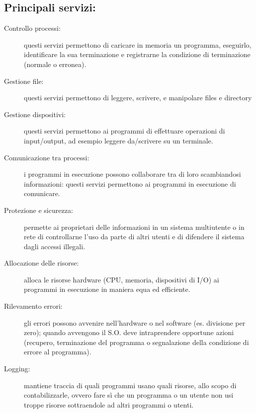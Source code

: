 \subsection{Principali servizi:}
\begin{description}
    \item[Controllo processi:] questi servizi permettono di caricare in memoria un programma, eseguirlo, identificare la sua terminazione e registrarne la condizione di terminazione (normale o erronea).
    \item[Gestione file:] questi servizi permettono di leggere, scrivere, e manipolare files e directory
    \item[Gestione dispositivi:] questi servizi permettono ai programmi di effettuare operazioni di input/output, ad esempio leggere da/scrivere su un terminale.
    \item[Comunicazione tra processi:] i programmi in esecuzione possono collaborare tra di loro scambiandosi informazioni: questi servizi permettono ai programmi in esecuzione di comunicare.
    \item[Protezione e sicurezza:] permette ai proprietari delle informazioni in un sistema multiutente o in rete di controllarne l'uso da parte di altri utenti e di difendere il sistema dagli accessi illegali.
    \item[Allocazione delle risorse:] alloca le risorse hardware (CPU, memoria, dispositivi di I/O) ai programmi in esecuzione in maniera equa ed efficiente.
    \item[Rilevamento errori:] gli errori possono avvenire nell'hardware o nel software (es. divisione per zero); quando avvengono il S.O. deve intraprendere opportune azioni (recupero, terminazione del programma o segnalazione della condizione di errore al programma).
    \item[Logging:] mantiene traccia di quali programmi usano quali risorse, allo scopo di contabilizzarle, ovvero fare sì che un programma o un utente non usi troppe risorse sottraendole ad altri programmi o utenti.
\end{description}

